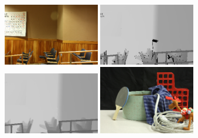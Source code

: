 \begin{figure}[htb]
\begin{minipage}[b]{0.3\linewidth}
\end{minipage}
\vfill
\begin{minipage}[b]{0.3\linewidth}
  \centering
  \centerline{\includegraphics[width=4.2cm]{depth_interp/quali_rst/img_Classroom1-perfect.png}}
\end{minipage}
%
\hfill
\begin{minipage}[b]{0.3\linewidth}
  \centering
  \centerline{\includegraphics[width=4.2cm]{depth_interp/quali_rst/n_hf_Classroom1-perfect.png}}
\end{minipage}
\hfill
\begin{minipage}[b]{0.3\linewidth}
  \centering
  \centerline{\includegraphics[width=4.2cm]{depth_interp/quali_rst/hf_Classroom1-perfect.png}}
\end{minipage}
\vfill
\begin{minipage}[b]{0.3\linewidth}
  \centering
  \centerline{\includegraphics[width=4.2cm]{depth_interp/quali_rst/img_Cable-perfect.png}}

\end{minipage}
\end{figure}
